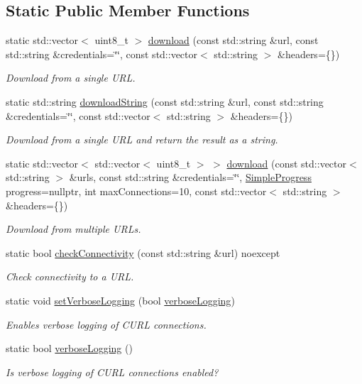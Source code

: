 \subsection*{Static Public Member Functions}
\begin{DoxyCompactItemize}
\item 
static std\+::vector$<$ uint8\+\_\+t $>$ \hyperlink{group___network_module_ga8f1ba1b79c2af5d051f6e8591cd0ea89}{download} (const std\+::string \&url, const std\+::string \&credentials=\char`\"{}\char`\"{}, const std\+::vector$<$ std\+::string $>$ \&headers=\{\})
\begin{DoxyCompactList}\small\item\em Download from a single U\+RL. \end{DoxyCompactList}\item 
static std\+::string \hyperlink{group___network_module_ga06013d9acaf746065be05b6571f2462a}{download\+String} (const std\+::string \&url, const std\+::string \&credentials=\char`\"{}\char`\"{}, const std\+::vector$<$ std\+::string $>$ \&headers=\{\})
\begin{DoxyCompactList}\small\item\em Download from a single U\+RL and return the result as a string. \end{DoxyCompactList}\item 
static std\+::vector$<$ std\+::vector$<$ uint8\+\_\+t $>$ $>$ \hyperlink{group___network_module_ga07d51f62025e158feeca83cbc40d8564}{download} (const std\+::vector$<$ std\+::string $>$ \&urls, const std\+::string \&credentials=\char`\"{}\char`\"{}, \hyperlink{group___utility_module_ga6763018df79e4bdbcd8cd14cea5342b2}{Simple\+Progress} progress=nullptr, int max\+Connections=10, const std\+::vector$<$ std\+::string $>$ \&headers=\{\})
\begin{DoxyCompactList}\small\item\em Download from multiple U\+R\+Ls. \end{DoxyCompactList}\item 
static bool \hyperlink{group___network_module_gab82b59cab6622abae4998f5fde08e688}{check\+Connectivity} (const std\+::string \&url) noexcept
\begin{DoxyCompactList}\small\item\em Check connectivity to a U\+RL. \end{DoxyCompactList}\item 
static void \hyperlink{group___network_module_ga4aa457ededfdc5fcb0db52f7215909cb}{set\+Verbose\+Logging} (bool \hyperlink{group___network_module_ga2470c65fd9d6dd62854a9c9e7df877c6}{verbose\+Logging})
\begin{DoxyCompactList}\small\item\em Enables verbose logging of C\+U\+RL connections. \end{DoxyCompactList}\item 
static bool \hyperlink{group___network_module_ga2470c65fd9d6dd62854a9c9e7df877c6}{verbose\+Logging} ()
\begin{DoxyCompactList}\small\item\em Is verbose logging of C\+U\+RL connections enabled? \end{DoxyCompactList}\end{DoxyCompactItemize}


